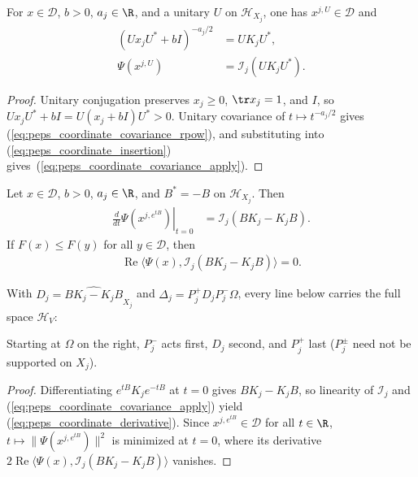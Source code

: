 \begin{lemma}
    \label{thm:peps_patch_coordinate_covariance}
    \leanok
    For $x\in\mathcal D$, $b>0$, $a_j\in\R$, and a unitary $U$
    on $\mathcal H_{X_j}$, one has $x^{j,U}\in\mathcal D$ and
    \begin{align}
        (Ux_jU^*+bI)^{-a_j/2} & =UK_jU^*,
        \label{eq:peps_coordinate_covariance_rpow}      \\
        \Psi(x^{j,U})         & =\mathcal I_j(UK_jU^*).
        \label{eq:peps_coordinate_covariance_apply}
    \end{align}
\end{lemma}
\begin{proof}
    \leanok
    Unitary conjugation preserves $x_j\ge0$, $\tr x_j=1$, and $I$,
    so $Ux_jU^*+bI=U(x_j+bI)U^*>0$. Unitary covariance of $t\mapsto t^{-a_j/2}$ gives
    (\ref{eq:peps_coordinate_covariance_rpow}), and substituting into (\ref{eq:peps_coordinate_insertion}) gives~(\ref{eq:peps_coordinate_covariance_apply}).
\end{proof}

\begin{lemma}
    \label{thm:peps_patch_first_variation}
    \leanok
    Let $x\in\mathcal D$, $b>0$, $a_j\in\R$, and $B^*=-B$ on $\mathcal H_{X_j}$. Then
    \begin{align}
        \left.\frac{d}{dt}\Psi(x^{j,e^{tB}})\right|_{t=0}
         & =\mathcal I_j(BK_j-K_jB).
        \label{eq:peps_coordinate_derivative}
    \end{align}
    If $F(x)\le F(y)$ for all $y\in\mathcal D$, then
    \begin{align}
        \operatorname{Re}\langle\Psi(x),\mathcal I_j(BK_j-K_jB)\rangle=0.
        \label{eq:peps_coordinate_first_variation}
    \end{align}

    With $D_j=\widehat{BK_j-K_jB}_{X_j}$ and
    $\Delta_j=P_j^+D_jP_j^-\Omega$, every line below carries the full space $\mathcal H_V$:
    
    Starting at $\Omega$ on the right, $P_j^-$ acts first, $D_j$ second,
    and $P_j^+$ last ($P_j^\pm$ need not be supported on $X_j$).
\end{lemma}
\begin{proof}
    \leanok
    Differentiating $e^{tB}K_je^{-tB}$ at $t=0$ gives $BK_j-K_jB$, so linearity of $\mathcal I_j$ and (\ref{eq:peps_coordinate_covariance_apply}) yield
    (\ref{eq:peps_coordinate_derivative}). Since $x^{j,e^{tB}}\in\mathcal D$ for all $t\in\R$,
    $t\mapsto\|\Psi(x^{j,e^{tB}})\|^2$ is minimized at $t=0$, where its derivative
    $2\operatorname{Re}\langle\Psi(x),\mathcal I_j(BK_j-K_jB)\rangle$ vanishes.
\end{proof}

